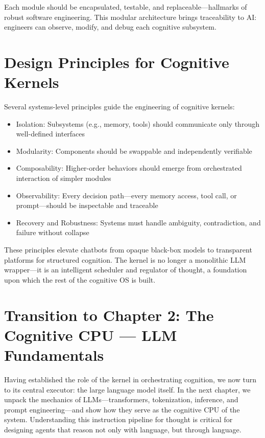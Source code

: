 \documentclass{book}
\begin{document}
Each module should be encapsulated, testable, and replaceable—hallmarks of robust software engineering. This modular architecture brings traceability to AI: engineers can observe, modify, and debug each cognitive subsystem.

\section{Design Principles for Cognitive Kernels}

Several systems-level principles guide the engineering of cognitive kernels:

\begin{itemize}
  \item Isolation: Subsystems (e.g., memory, tools) should communicate only through well-defined interfaces
  \item Modularity: Components should be swappable and independently verifiable
  \item Composability: Higher-order behaviors should emerge from orchestrated interaction of simpler modules
  \item Observability: Every decision path—every memory access, tool call, or prompt—should be inspectable and traceable
  \item Recovery and Robustness: Systems must handle ambiguity, contradiction, and failure without collapse
\end{itemize}

These principles elevate chatbots from opaque black-box models to transparent platforms for structured cognition. The kernel is no longer a monolithic LLM wrapper—it is an intelligent scheduler and regulator of thought, a foundation upon which the rest of the cognitive OS is built.

\section*{Transition to Chapter 2: The Cognitive CPU — LLM Fundamentals}

Having established the role of the kernel in orchestrating cognition, we now turn to its central executor: the large language model itself. In the next chapter, we unpack the mechanics of LLMs—transformers, tokenization, inference, and prompt engineering—and show how they serve as the cognitive CPU of the system. Understanding this instruction pipeline for thought is critical for designing agents that reason not only with language, but through language.
\end{document}
